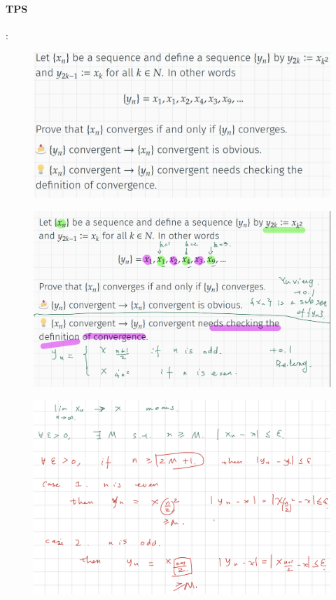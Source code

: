 \documentclass{article}
\begin{document}
\paragraph{TPS}:\\
\begin{figure}[H]
    \centering
    \includegraphics{0122}
\end{figure}
\begin{figure}[H]
    \centering
    \includegraphics{0128}
\end{figure}
\begin{figure}[H]
    \centering
    \includegraphics{0129}
\end{figure}
\end{document}
